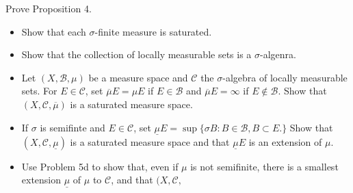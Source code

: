 \documentclass[14.5pt]{article}
\newenvironment{problem}[2][Problem]{\begin{mdframed}[backgroundcolor=gray!10, leftline = false, rightline=false, linewidth=0.25pt]  \begin{trivlist}
\item[\hskip \labelsep {\bfseries #1}\hskip \labelsep {\bfseries #2.}]}{\end{trivlist} \end{mdframed}  }
\begin{document}
\begin{problem}{7, page 222} Prove Proposition 4.
\end{problem}

\begin{problem}{8, page 222}
\begin{itemize}
    \item[a.] Show that each $\sigma$-finite measure is saturated.
    \item[b.] Show that the collection of locally measurable sets is a $\sigma$-algenra. 
    \item[c.] Let $(X, \mathcal{B}, \mu)$ be a measure space and $\mathcal{C}$ the $\sigma$-algebra of locally measurable sets. For $E \in \mathcal{C}$, set $\overline{\mu} E  = \mu E$ if $E \in \mathcal{B}$ and $\overline{\mu} E = \infty$ if $E \notin \mathcal{B}$. Show that $(X, \mathcal{C}, \overline{\mu})$ is a saturated measure space.
    \item[d.] If $\sigma$ is semifinte and $E \in \mathcal{C}$, set $\underline{\mu} E = \sup \{ \sigma B: B \in \mathcal B, B \subset E.\}$ Show that $(X, \mathcal C, \underline{\mu})$ is a saturated measure space and that $\underline{\mu} E$ is an extension of $\mu$.
    \item[e.] Use Problem 5d to show that, even if $\mu$ is not semifinite, there is a smallest extension $\underline \mu$ of $\mu$ to $\mathcal{C}$, and that $(X, \mathcal{C}, $ 
\end{itemize}
    
\end{problem}
\end{document}
